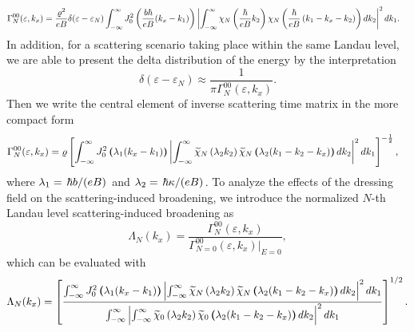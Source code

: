 \begin{widetext}
  \begin{equation} \label{eq:17}
   \begin{aligned}
     &\Gamma^{00}_{N} (\varepsilon,k_x) =
     \frac { \varrho^2}{eB}
     \delta(\varepsilon - \varepsilon_{N})
     \int_{-\infty}^{\infty}
     J_0^2 \bm{\left(} \frac{b\hbar}{eB}({k}_x - k_1) \bm{\right)}
     \left|
     \int_{-\infty}^{\infty}
     \chi_N \left( \frac{\hbar}{eB}k_2 \right)
     \chi_N \bm{\left(} \frac{\hbar}{eB}
     \left( k_1 - {k}_x - k_2 \right) \bm{\right)}
     dk_2 \right|^2 d k_1.
   \end{aligned}
  \end{equation}
In addition, for a scattering scenario taking place within the same Landau level, we are able to present the delta distribution of the energy by the  interpretation \cite{dini16}
\begin{equation} \label{eq:18}
 \delta(\varepsilon - \varepsilon_{N}) \approx
 \frac{1}{\pi \Gamma^{00}_N (\varepsilon,k_x)}.
\end{equation}
Then we write the central element of inverse scattering time matrix in the more compact form
\begin{equation} \label{eq:19}
  \begin{aligned}
    &\Gamma^{00}_{N}(\varepsilon,k_x) =
     \varrho
      \left[
      \int_{-\infty}^{\infty}
      J_0^2 \bm{\left(} \lambda_1 (k_x - k_1) \bm{\right)}
      \left|
      \int_{-\infty}^{\infty}
      \widetilde{\chi}_{N}\left(\lambda_2 k_2 \right)
      \widetilde{\chi}_{N} \bm{\left(} \lambda_2 (k_1 - k_2 - k_x) \bm{\right)}
      dk_2 \right|^2
      dk_1
      \right]^{-\frac{1}{2}},
  \end{aligned}
\end{equation}
where $ \lambda_1 = \flatfrac{\hbar b}{(eB)}$ and  $\lambda_2 = \flatfrac{\hbar \kappa}{(eB)}$.
To analyze the effects of the dressing field on the scattering-induced broadening, we introduce the normalized $N$-th Landau level scattering-induced broadening as
\begin{equation} \label{eq:20}
    \Lambda_N(k_x) =
    \frac{\Gamma^{00}_N (\varepsilon,k_x)}
    {\Gamma^{00}_{N=0}(\varepsilon,k_x)\big|_{E=0}},
\end{equation}
which can be evaluated with
\begin{equation} \label{eq:21}
    \Lambda_N (k_x) =
    \left[
    \frac
    {
      \int_{-\infty}^{\infty}
      J_0^2 \bm{\left(} \lambda_1 (k_x - k_1) \bm{\right)}
      \left|
      \int_{-\infty}^{\infty}
      \widetilde{\chi}_{N}\left(\lambda_2 k_2 \right)
      \widetilde{\chi}_{N} \bm{\left(} \lambda_2 (k_1 - k_2 - k_x) \bm{\right)}
      dk_2 \right|^2
      dk_1
    }
    {
      \int_{-\infty}^{\infty}
      \left|
      \int_{-\infty}^{\infty}
      \widetilde{\chi}_0 \left(\lambda_2 k_2 \right)
      \widetilde{\chi}_0 \bm{\left(} \lambda_2 (k_1 - k_2 - k_x) \bm{\right)}
      dk_2 \right|^2
      dk_1
    }
    \right]^{1/2}.
\end{equation}
\end{widetext}

